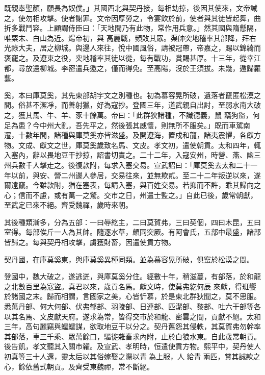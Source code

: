 \begin{pinyinscope}
 既親奉聖顏，願長為奴僕。」其國西北與契丹接，每相劫掠，後因其使來，文帝誡之，使勿相攻擊。使者謝罪。文帝因厚勞之，令宴飲於前，使者與其徒皆起舞，曲折多戰鬥容。上顧謂侍臣曰：「天地間乃有此物，常作用兵意。」然其國與隋懸隔，唯粟末、白山為近。煬帝初，與
 高麗戰，頻敗其眾。渠帥突地稽率其部降，拜右光祿大夫，居之柳城。與邊人來往，悅中國風俗，請被冠帶，帝嘉之，賜以錦綺而褒寵之。及遼東之役，突地稽率其徒以從，每有戰功，賞賜甚厚。十三年，從幸江都，尋放還柳城。李密遣兵邀之，僅而得免。至高陽，沒於王須拔。未幾，遁歸羅藝。



 奚，本曰庫莫奚，其先東部胡宇文之別種也。初為慕容晃所破，遺落者竄匿松漠之間。俗甚不潔凈，而善射獵，好為寇抄。登國三年，道武親自出討，至弱水南大破之，獲其馬、牛、羊、豕十餘萬。帝曰：「此群狄諸種，不識德義，鼠
 竊狗盜，何足為患？今中州大亂，吾先平之，然後張其威懷，則無所不服矣。」既而車駕南遷，十數年間，諸種與庫莫奚亦皆滋盛。及開遼海，置戍和龍，諸夷震懼，各獻方物。文成、獻文之世，庫莫奚歲致名馬、文皮。孝文初，遣使朝貢。太和四年，輒入塞內，辭以畏地豆干抄掠，詔書切責之。二十二年，入寇安州，時營、燕、幽三州兵數千人擊走之。後復款附，每求入塞交易。宣武詔曰：「庫莫奚去太和二十一年以前，與安、營二州邊人參居，交易往來，並無欺貳。至二十二年叛逆以來，遂爾遠竄。今雖款附，猶在塞表，每請入塞，與百姓交易。若抑而不許，乖其歸向之
 心；信而不慮，或有萬一之驚。交市之日，州遣士監之。」自此已後，歲常朝獻，至武定已來不絕。齊受魏禪，歲時來朝。



 其後種類漸多，分為五部：一曰辱紇主，二曰莫賀弗，三曰契個，四曰木昆，五曰室得。每部俟斤一人為其帥。隨逐水草，頗同突厥。有阿會氏，五部中最盛，諸部皆歸之。每與契丹相攻擊，虜獲財畜，因遣使貢方物。



 契丹國，在庫莫奚東，與庫莫奚異種同類。並為慕容晃所破，俱竄於松漠之間。



 登國中，魏大破之，遂逃迸，與庫莫奚分住。經數十年，稍滋蔓，有部落，於和龍之北數百里為寇盜。真君以來，歲貢名馬。獻文時，使莫弗紇何辰
 來獻，得班饗於諸國之末。歸而相謂，言國家之美，心皆忻慕，於是東北群狄聞之，莫不思服。悉萬丹部、何大何部、伏弗郁部、羽陵部、日連部、匹潔部、黎部、吐六干部等各以其名馬、文皮獻天府。遂求為常，皆得交市於和龍、密雲之間，貢獻不絕。太和三年，高句麗竊與蠕蠕謀，欲取地豆干以分之。契丹舊怨其侵軼，其莫賀弗勿幹率其部落，車三千乘、眾萬餘口，驅徙雜畜求內附，止於白狼水東。自此歲常朝貢。後告飢，孝文聽其入關市糴。及宣武、孝明時，恒遣使貢方物。熙平中，契丹使人初真等三十人還，靈太后以其俗嫁娶之際以青為上服，人
 給青兩匹，賞其誠款之心，餘依舊式朝貢。及齊受東魏禪，常不斷絕。




\end{pinyinscope}
